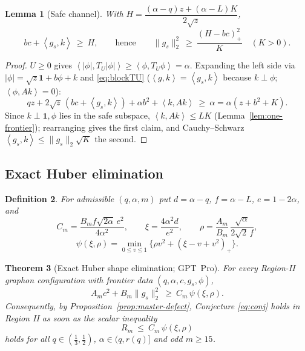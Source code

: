 \documentclass[11pt]{article}
\newtheorem{theorem}{Theorem}[section]
\newtheorem{lemma}[theorem]{Lemma}
\newtheorem{definition}[theorem]{Definition}
\newcommand{\one}{\mathbf 1}
\newcommand{\ip}[2]{\left\langle #1,#2\right\rangle}
\newcommand{\pos}[1]{\left(#1\right)_{+}}
\begin{document}
\begin{lemma}[Safe channel]\label{lem:safe}
With $H=\dfrac{(\alpha-q)z+(\alpha-L)K}{2\sqrt z}$,
\[
        bc+\ip{g_s}{k}\ \ge\ H,
        \qquad\text{hence}\qquad
        \|g_s\|_2^2\ \ge\ \frac{\pos{H-bc}^2}{K}\quad(K>0).
\]
\end{lemma}

\begin{proof}
$U\ge0$ gives $\ip{|\phi|}{T_U|\phi|}\ge\ip{\phi}{T_U\phi}=\alpha$.  Expanding
the left side via $|\phi|=\sqrt z\one+b\phi+k$ and \eqref{eq:blockTU}
($\ip gk=\ip{g_s}k$ because $k\perp\phi$; $\ip{\phi}{Ak}=0$):
\[
        qz+2\sqrt z\,(bc+\ip{g_s}k)+\alpha b^2+\ip k{Ak}\ \ge\ \alpha
        =\alpha(z+b^2+K).
\]
Since $k\perp\one,\phi$ lies in the safe subspace, $\ip k{Ak}\le LK$
(Lemma~\ref{lem:one-frontier}); rearranging gives the first claim, and
Cauchy--Schwarz $\ip{g_s}k\le\|g_s\|_2\sqrt K$ the second.
\end{proof}

\subsection{Exact Huber elimination}

\begin{definition}\label{def:huber}
For admissible $(q,\alpha,m)$ put $d=\alpha-q$, $f=\alpha-L$, $e=1-2\alpha$, and
\begin{equation}\label{eq:Cxirho}
        C_m=\frac{B_mf\sqrt{2\alpha}\,e^2}{4\alpha^2},
        \qquad
        \xi=\frac{4\alpha^2d}{e^2},
        \qquad
        \rho=\frac{A_m}{B_m}\,\frac{\sqrt\alpha}{2\sqrt2\,f},
\end{equation}
\begin{equation}\label{eq:psi}
        \psi(\xi,\rho)=\min_{0\le v\le1}\bigl\{\rho v^2+\pos{\xi-v+v^2}\bigr\}.
\end{equation}
\end{definition}

\begin{theorem}[Exact Huber shape elimination; GPT~Pro]\label{thm:huber}
For every Region-II graphon configuration with frontier data
$(q,\alpha,c,g_s,\phi)$,
\[
        A_mc^2+B_m\|g_s\|_2^2\ \ge\ C_m\,\psi(\xi,\rho).
\]
Consequently, by Proposition~\ref{prop:master-defect}, Conjecture \eqref{eq:conj}
holds in Region II as soon as the scalar inequality
\begin{equation}\label{eq:scalar-target}
        R_m\ \le\ C_m\,\psi(\xi,\rho)
\end{equation}
holds for all $q\in(\tfrac13,\tfrac12)$, $\alpha\in(q,r(q)]$ and odd $m\ge15$.
\end{theorem}
\end{document}
